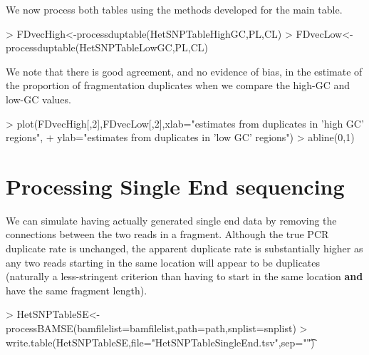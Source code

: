 \documentclass{article}
\begin{document}
We now process both tables using the methods developed for the main table. 


\begin{Schunk}
\begin{Sinput}
> FDvecHigh<-processduptable(HetSNPTableHighGC,PL,CL)
> FDvecLow<-processduptable(HetSNPTableLowGC,PL,CL)
\end{Sinput}
\end{Schunk}

We note that there is good agreement, and no evidence of bias, in the estimate of the proportion of fragmentation duplicates when we compare the high-GC and low-GC values.

\begin{Schunk}
\begin{Sinput}
>   plot(FDvecHigh[,2],FDvecLow[,2],xlab="estimates from duplicates in 'high GC' regions",
+        ylab="estimates from duplicates in 'low GC' regions")
> abline(0,1)
\end{Sinput}
\end{Schunk}

\clearpage{}

\section{Processing Single End sequencing}

We can simulate having actually generated single end data by removing the connections between the two reads in a fragment. Although the true PCR duplicate rate is unchanged, the apparent duplicate rate is substantially higher as any two reads starting in the same location will appear to be duplicates (naturally a less-stringent criterion than having to start in the same location \textbf{and} have the same fragment length). 



\begin{Schunk}
\begin{Sinput}
> HetSNPTableSE<-processBAMSE(bamfilelist=bamfilelist,path=path,snplist=snplist)
> write.table(HetSNPTableSE,file="HetSNPTableSingleEnd.tsv",sep="\t")
\end{Sinput}
\end{Schunk}
\end{document}
